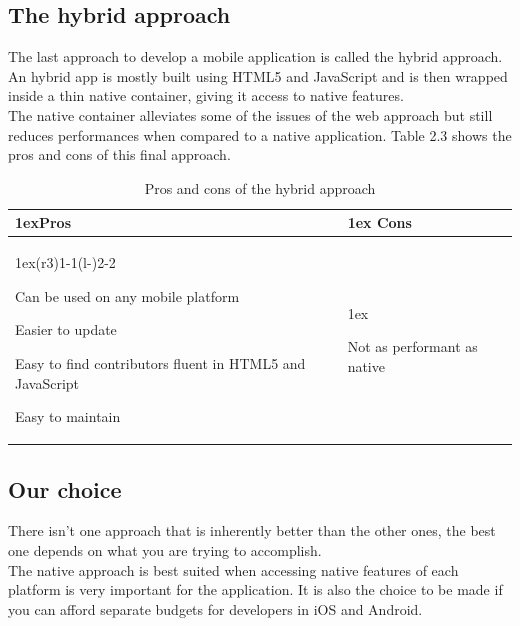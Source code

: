 \documentclass{eplmastersthesis}
\begin{document}
\subsection{The hybrid approach}

The last approach to develop a mobile application is called the hybrid approach. An hybrid app is mostly built using HTML5 and JavaScript and is then wrapped inside a thin native container, giving it access to native features.\\

The native container alleviates some of the issues of the web approach but still reduces performances when compared to a native application. Table 2.3 shows the pros and cons of this final approach.

\begin{table}[H]
\begin{tabularx}{\linewidth}{>{\parskip1ex}X@{\kern4\tabcolsep}>{\parskip1ex}X}
\toprule
\hfil\bfseries Pros
&
\hfil\bfseries Cons
\\\cmidrule(r{3\tabcolsep}){1-1}\cmidrule(l{-\tabcolsep}){2-2}

Can be used on any mobile platform\par
Easier to update\par
Easy to find contributors fluent in HTML5 and JavaScript\par
Easy to maintain\par

&

Not as performant as native\par



\\\bottomrule
\end{tabularx}
\caption{Pros and cons of the hybrid approach}
\end{table}

\subsection{Our choice}

There isn't one approach that is inherently better than the other ones, the best one depends on what you are trying to accomplish.\\

The native approach is best suited when accessing native features of each platform is very important for the application. It is also the choice to be made if you can afford separate budgets for developers in iOS and Android.\\
\end{document}

